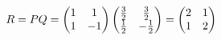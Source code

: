 \documentclass[preview]{standalone}
\begin{document}
\begin{align*}
\special{dvisvgm:raw <g id='unique000'>}R=PQ=\begin{pmatrix}1&1\\1&-1\end{pmatrix}\begin{pmatrix}\frac32&\frac32\\\frac12&-\frac12\end{pmatrix}=\begin{pmatrix}2&1\\1&2\end{pmatrix}\special{dvisvgm:raw </g>}
\end{align*}
\end{document}
